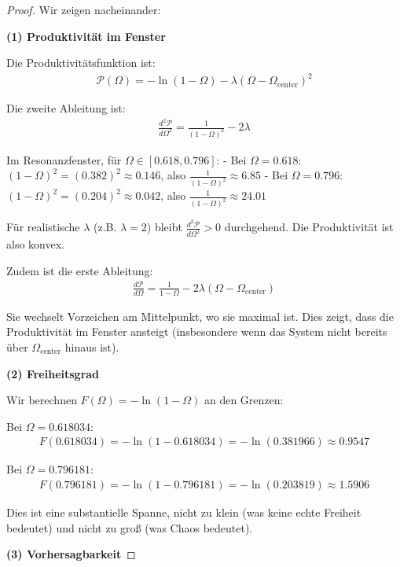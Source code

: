 \documentclass[a4paper, 12pt, twoside, openright]{report}
\theoremstyle{definition}
\theoremstyle{definition}
\begin{document}
\begin{proof}

Wir zeigen nacheinander:

\textbf{(1) Produktivität im Fenster}

Die Produktivitätsfunktion ist:
\begin{align}
\mathcal{P}(\Omega) = -\ln(1-\Omega) - \lambda(\Omega - \Omega_{\text{center}})^2
\end{align}

Die zweite Ableitung ist:
\begin{align}
\frac{d^2\mathcal{P}}{d\Omega^2} = \frac{1}{(1-\Omega)^2} - 2\lambda
\end{align}

Im Resonanzfenster, für $\Omega \in [0.618, 0.796]$:
- Bei $\Omega = 0.618$: $(1-\Omega)^2 = (0.382)^2 \approx 0.146$, also $\frac{1}{(1-\Omega)^2} \approx 6.85$
- Bei $\Omega = 0.796$: $(1-\Omega)^2 = (0.204)^2 \approx 0.042$, also $\frac{1}{(1-\Omega)^2} \approx 24.01$

Für realistische $\lambda$ (z.B. $\lambda = 2$) bleibt $\frac{d^2\mathcal{P}}{d\Omega^2} > 0$ durchgehend. Die Produktivität ist also konvex.

Zudem ist die erste Ableitung:
\begin{align}
\frac{d\mathcal{P}}{d\Omega} = \frac{1}{1-\Omega} - 2\lambda(\Omega - \Omega_{\text{center}})
\end{align}

Sie wechselt Vorzeichen am Mittelpunkt, wo sie maximal ist. Dies zeigt, dass die Produktivität im Fenster ansteigt (insbesondere wenn das System nicht bereits über $\Omega_{\text{center}}$ hinaus ist).

\textbf{(2) Freiheitsgrad}

Wir berechnen $F(\Omega) = -\ln(1-\Omega)$ an den Grenzen:

Bei $\Omega = 0.618034$:
\begin{align}
F(0.618034) = -\ln(1 - 0.618034) = -\ln(0.381966) \approx 0.9547
\end{align}

Bei $\Omega = 0.796181$:
\begin{align}
F(0.796181) = -\ln(1 - 0.796181) = -\ln(0.203819) \approx 1.5906
\end{align}

Dies ist eine substantielle Spanne, nicht zu klein (was keine echte Freiheit bedeutet) und nicht zu groß (was Chaos bedeutet).

\textbf{(3) Vorhersagbarkeit}


\end{proof}
\end{document}
